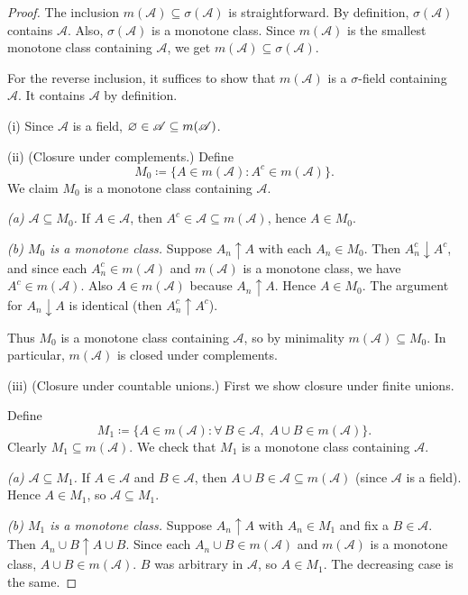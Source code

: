\begin{proof}
	The inclusion $m(\mathscr{A}) \subseteq \sigma(\mathscr{A})$ is straightforward.
	By definition, $\sigma(\mathscr{A})$ contains $\mathscr{A}$.
	Also, $\sigma(\mathscr{A})$ is a monotone class.
	Since $m(\mathscr{A})$ is the smallest monotone class containing $\mathscr{A}$, we get
	$m(\mathscr{A}) \subseteq \sigma(\mathscr{A})$.

	For the reverse inclusion, it suffices to show that $m(\mathscr{A})$ is a $\sigma$-field
	containing $\mathscr{A}$. It contains $\mathscr{A}$ by definition.

	(i) Since $\mathscr{A}$ is a field, $\varnothing \in \mathscr{A} \subseteq m(\mathscr{A})$.

	(ii) (Closure under complements.) Define
	\[
		M_0 \coloneqq \{A \in m(\mathscr{A}) : A^{c} \in m(\mathscr{A})\}.
	\]
	We claim $M_0$ is a monotone class containing $\mathscr{A}$.

	\emph{(a) $\mathscr{A} \subseteq M_0$.}
	If $A \in \mathscr{A}$, then $A^c \in \mathscr{A} \subseteq m(\mathscr{A})$, hence $A \in M_0$.

	\emph{(b) $M_0$ is a monotone class.}
	Suppose $A_n \uparrow A$ with each $A_n \in M_0$.
	Then $A_n^c \downarrow A^c$, and since each $A_n^c \in m(\mathscr{A})$ and $m(\mathscr{A})$
	is a monotone class, we have $A^c \in m(\mathscr{A})$. Also $A \in m(\mathscr{A})$ because
	$A_n \uparrow A$. Hence $A \in M_0$.
	The argument for $A_n \downarrow A$ is identical (then $A_n^c \uparrow A^c$).

	Thus $M_0$ is a monotone class containing $\mathscr{A}$, so by minimality
	$m(\mathscr{A}) \subseteq M_0$. In particular, $m(\mathscr{A})$ is closed under complements.

	(iii) (Closure under countable unions.) First we show closure under finite unions.

	Define
	\[
		M_1 \coloneqq \{A \in m(\mathscr{A}) : \forall\,B \in \mathscr{A},\; A \cup B \in m(\mathscr{A})\}.
	\]
	Clearly $M_1 \subseteq m(\mathscr{A})$. We check that $M_1$ is a monotone class containing
	$\mathscr{A}$.

	\emph{(a) $\mathscr{A} \subseteq M_1$.}
	If $A \in \mathscr{A}$ and $B \in \mathscr{A}$, then $A \cup B \in \mathscr{A} \subseteq m(\mathscr{A})$
	(since $\mathscr{A}$ is a field). Hence $A \in M_1$, so $\mathscr{A} \subseteq M_1$.

	\emph{(b) $M_1$ is a monotone class.}
	Suppose $A_n \uparrow A$ with $A_n \in M_1$ and fix a $B \in \mathscr{A}$.
	Then $A_n \cup B \uparrow A \cup B$. Since each $A_n \cup B \in m(\mathscr{A})$ and $m(\mathscr{A})$ is
	a monotone class, $A \cup B \in m(\mathscr{A})$. $B$ was arbitrary in $\mathscr{A}$, so $A \in M_1$.
	The decreasing case is the same.


\end{proof}
